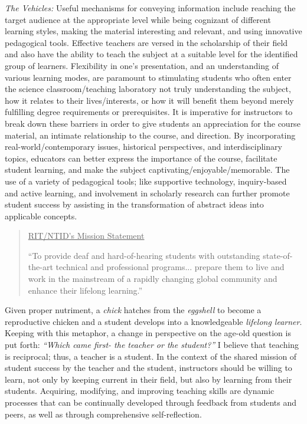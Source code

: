 \documentclass[11.5pt]{sig-alternate} %
\begin{document}
\begin{large}
\textit{The Vehicles:} Useful mechanisms for conveying information include reaching the target audience at the appropriate level while being cognizant of different learning styles, making the material interesting and relevant, and using innovative pedagogical tools. Effective teachers are versed in the scholarship of their field and also have the ability to teach the subject at a suitable level for the identified group of learners. Flexibility in one’s presentation, and an understanding of various learning modes, are paramount to stimulating students who often enter the science classroom/teaching laboratory not truly understanding the subject, how it relates to their lives/interests, or how it will benefit them beyond merely fulfilling degree requirements or prerequisites. It is imperative for instructors to break down these barriers in order to give students an appreciation for the course material, an intimate relationship to the course, and direction. By incorporating real-world/contemporary issues, historical perspectives, and interdisciplinary topics, educators can better express the importance of the course, facilitate student learning, and make the subject captivating/enjoyable/memorable. The use of a variety of pedagogical tools; like supportive technology, inquiry-based and active learning, and involvement in scholarly research can further promote student success by assisting in the transformation of abstract ideas into applicable concepts.

\begin{quote}
\underline{RIT/NTID's Mission Statement}

``To provide deaf and hard-of-hearing students with outstanding state-of-the-art technical and professional programs... prepare them to live and work in the mainstream of a rapidly changing global community and enhance their lifelong learning.''
\end{quote}

Given proper nutriment, a \textit{chick} hatches from the \textit{eggshell} to become a reproductive chicken and a student develops into a knowledgeable \textit{lifelong learner}. Keeping with this metaphor, a change in perspective on the age-old question is put forth: \textit{“Which came first- the teacher or the student?”} I believe that teaching is reciprocal; thus, a teacher is a student. In the context of the shared mission of student success by the teacher and the student, instructors should be willing to learn, not only by keeping current in their field, but also by learning from their students. Acquiring, modifying, and improving teaching skills are dynamic processes that can be continually developed through feedback from students and peers, as well as through comprehensive self-reflection.


\end{large}
\end{document}
